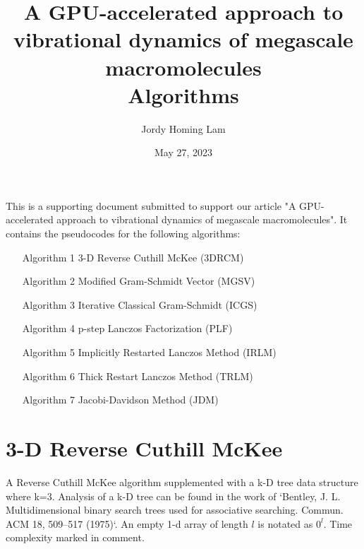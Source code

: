 \documentclass[a4paper]{article}
\title{A GPU-accelerated approach to vibrational dynamics of megascale macromolecules \protect\\ Algorithms \protect\\}
\author{Jordy Homing Lam}
\date{May 27, 2023}
\begin{document}
\maketitle

This is a supporting document submitted to support our article "A GPU-accelerated approach to vibrational dynamics of megascale macromolecules". It contains the pseudocodes for the following algorithms:
\begin{itemize}
\item [Algorithm 1] 3-D Reverse Cuthill McKee (3DRCM)
\item [Algorithm 2] Modified Gram-Schmidt Vector (MGSV)
\item [Algorithm 3] Iterative Classical Gram-Schmidt (ICGS)
\item [Algorithm 4] p-step Lanczos Factorization (PLF)
\item [Algorithm 5] Implicitly Restarted Lanczos Method (IRLM)
\item [Algorithm 6] Thick Restart Lanczos Method (TRLM)
\item [Algorithm 7] Jacobi-Davidson Method (JDM)
\end{itemize}











\pagebreak







\section{3-D Reverse Cuthill McKee}

A Reverse Cuthill McKee algorithm supplemented with a k-D tree data structure where k=3. Analysis of a k-D tree can be found in the work of `Bentley, J. L. Multidimensional binary search trees used for associative searching. Commun. ACM 18, 509–517 (1975)`. An empty 1-d array of length $l$ is notated as $0^l$. Time complexity marked in comment.
\end{document}
